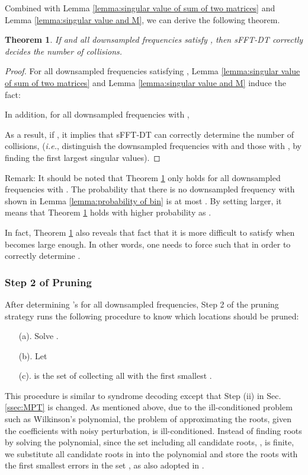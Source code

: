 \documentclass[journal,onecolumn,11pt]{IEEEtran}
\newtheorem{theorem}{Theorem}
\begin{document}
Combined with Lemma \ref{lemma:singular value of sum of two matrices} and Lemma \ref{lemma:singular value and M}, we can derive the following theorem.
\begin{theorem}
\label{theorem:successfuly determine a}
If  and all downsampled frequencies satisfy , then sFFT-DT correctly decides the number of collisions.
\end{theorem}
\begin{proof}
For all downsampled frequencies satisfying , Lemma \ref{lemma:singular value of sum of two matrices} and Lemma \ref{lemma:singular value and M} induce the fact:

In addition, for all downsampled frequencies with ,

As a result, if , it implies that sFFT-DT can correctly determine the number of collisions, ({\em i.e.}, distinguish the downsampled frequencies with  and those with , by finding the first  largest singular values).
\end{proof}

Remark: It should be noted that Theorem \ref{theorem:successfuly determine a} only holds for all downsampled frequencies with . The probability that there is no downsampled frequency with  shown in Lemma \ref{lemma:probability of bin} is at most . By setting  larger, it means that Theorem \ref{theorem:successfuly determine a} holds with higher probability as .



In fact, Theorem \ref{theorem:successfuly determine a} also reveals that fact that it is more difficult to satisfy  when  becomes large enough.
In other words, one needs to force  such that  in order to correctly determine .

\subsubsection{Step 2 of Pruning}
After determining 's for all downsampled frequencies, Step 2 of the pruning strategy runs the following procedure to know which locations should be pruned:
\begin{itemize}
  \item[(a).] Solve .
  \item[(b).] Let 
  \item[(c).]  is the set of collecting all  with the first  smallest .
\end{itemize}
This procedure is similar to syndrome decoding except that Step (ii) in Sec. \ref{ssec:MPT} is changed.
As mentioned above, due to the ill-conditioned problem such as Wilkinson's polynomial, the problem of approximating the roots, given the coefficients with noisy perturbation, is ill-conditioned.
Instead of finding roots by solving the polynomial, since the set including all candidate roots, , is finite, we substitute all candidate roots in  into the polynomial and store the roots with the first  smallest errors in the set , as also adopted in \cite{Takos2008}.
\end{document}
